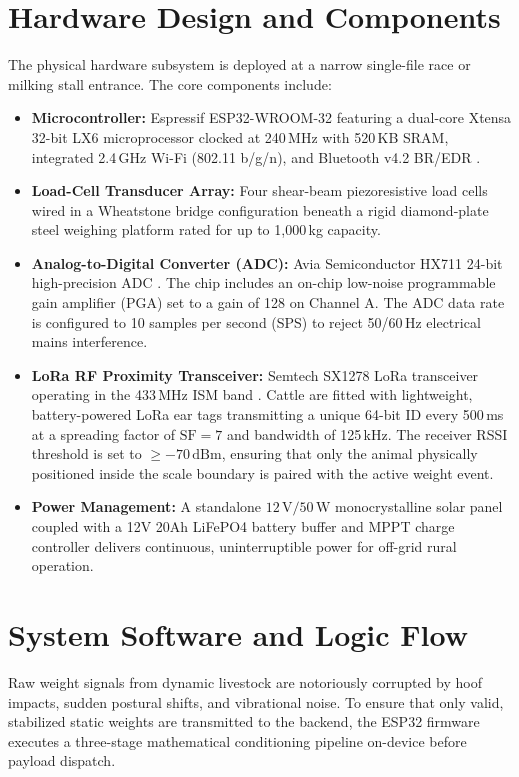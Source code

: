 \documentclass[11pt,a4paper]{report}
\begin{document}
\section{Hardware Design and Components}
The physical hardware subsystem is deployed at a narrow single-file race or milking stall entrance. The core components include:
\begin{itemize}
    \item \textbf{Microcontroller:} Espressif ESP32-WROOM-32 featuring a dual-core Xtensa 32-bit LX6 microprocessor clocked at 240\,MHz with 520\,KB SRAM, integrated 2.4\,GHz Wi-Fi (802.11 b/g/n), and Bluetooth v4.2 BR/EDR \cite{espressif2023esp32}.
    \item \textbf{Load-Cell Transducer Array:} Four shear-beam piezoresistive load cells wired in a Wheatstone bridge configuration beneath a rigid diamond-plate steel weighing platform rated for up to 1,000\,kg capacity.
    \item \textbf{Analog-to-Digital Converter (ADC):} Avia Semiconductor HX711 24-bit high-precision ADC \cite{avia2014hx711}. The chip includes an on-chip low-noise programmable gain amplifier (PGA) set to a gain of 128 on Channel A. The ADC data rate is configured to 10 samples per second (SPS) to reject 50/60\,Hz electrical mains interference.
    \item \textbf{LoRa RF Proximity Transceiver:} Semtech SX1278 LoRa transceiver operating in the 433\,MHz ISM band \cite{semtech2020sx1278}. Cattle are fitted with lightweight, battery-powered LoRa ear tags transmitting a unique 64-bit ID every 500\,ms at a spreading factor of $\text{SF}=7$ and bandwidth of 125\,kHz. The receiver RSSI threshold is set to $\ge -70\,\text{dBm}$, ensuring that only the animal physically positioned inside the scale boundary is paired with the active weight event.
    \item \textbf{Power Management:} A standalone $12\,\text{V} / 50\,\text{W}$ monocrystalline solar panel coupled with a 12V 20Ah LiFePO4 battery buffer and MPPT charge controller delivers continuous, uninterruptible power for off-grid rural operation.
\end{itemize}

\section{System Software and Logic Flow}
Raw weight signals from dynamic livestock are notoriously corrupted by hoof impacts, sudden postural shifts, and vibrational noise. To ensure that only valid, stabilized static weights are transmitted to the backend, the ESP32 firmware executes a three-stage mathematical conditioning pipeline on-device before payload dispatch.
\end{document}
